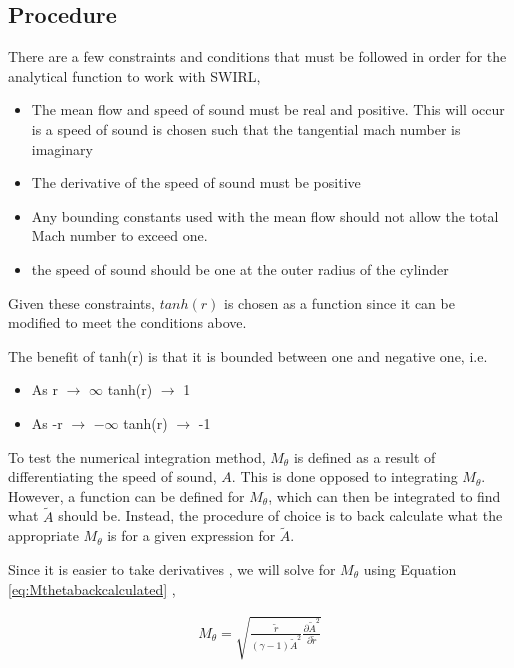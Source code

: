 
\subsection{Procedure}
There are a few constraints and conditions that must be followed in order for the analytical 
function to work with SWIRL, 

\begin{itemize}
    \item The mean flow and speed of sound must be real and positive. This will 
        occur is a speed of sound is chosen such that the tangential mach number
        is imaginary
    \item The derivative of the speed of sound must be positive
    \item Any bounding constants used with the mean flow should not allow the 
        total Mach number to exceed one.
    \item the speed of sound should be one at the outer radius of the cylinder
\end{itemize}

Given these constraints, $tanh(r)$ is chosen as a function since it can be
modified to meet the conditions above.

The benefit of tanh(r) is that it is bounded between one and negative one, i.e.

\begin{itemize}
    \item As r $\rightarrow$ $\infty$ tanh(r) $\rightarrow$ 1
    \item As -r $\rightarrow$ $-\infty$ tanh(r) $\rightarrow$ -1
\end{itemize}

To test the numerical integration method,  $M_{\theta}$ is defined as a result 
of differentiating the speed of sound, $A$. This is done opposed to integrating
$M_{\theta}$. However, a function can be defined for $M_{\theta}$, which can 
then be integrated to find what $\widetilde{A}$ should be. 
Instead, the procedure of choice is to back calculate what the appropriate 
$M_{\theta}$ is for a given expression for $\widetilde{A}$.

Since it is easier to take derivatives , we will solve for $M_{\theta}$ using 
Equation \ref{eq:Mthetabackcalculated} ,

\begin{align*}
    M_{\theta} = \sqrt{ \frac{\widetilde{r}}{(\gamma -1) \widetilde{A}^2} 
    \frac{\partial \widetilde{A}^2}{\partial \widetilde{r}}}
\end{align*}

